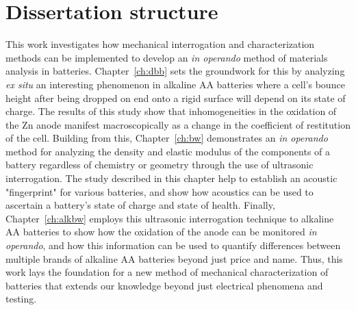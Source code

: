 \section{Dissertation structure}
\label{sec:intro:structure}

This work investigates how mechanical interrogation and characterization methods can be implemented to develop an \textit{in operando} method of materials analysis in batteries. Chapter~\ref{ch:dbb} sets the groundwork for this by analyzing \textit{ex situ} an interesting phenomenon in alkaline AA batteries where a cell's bounce height after being dropped on end onto a rigid surface will depend on its state of charge. The results of this study show that inhomogeneities in the oxidation of the Zn anode manifest macroscopically as a change in the coefficient of restitution of the cell. Building from this, Chapter~\ref{ch:bw} demonstrates an \textit{in operando} method for analyzing the density and elastic modulus of the components of a battery regardless of chemistry or geometry through the use of ultrasonic interrogation. The study described in this chapter help to establish an acoustic "fingerprint" for various batteries, and show how acoustics can be used to ascertain a battery's state of charge and state of health. Finally, Chapter~\ref{ch:alkbw} employs this ultrasonic interrogation technique to alkaline AA batteries to show how the oxidation of the anode can be monitored \textit{in operando}, and how this information can be used to quantify differences between multiple brands of alkaline AA batteries beyond just price and name. Thus, this work lays the foundation for a new method of mechanical characterization of batteries that extends our knowledge beyond just electrical phenomena and testing.   